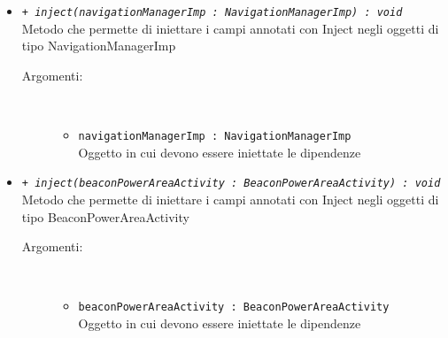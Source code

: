 \documentclass[../DefinizioneDiProdotto.tex]{subfiles}
\begin{document}
\begin{description}
\begin{itemize}
		\item \texttt{+ \textit{inject(navigationManagerImp : NavigationManagerImp) : void}}\\
		Metodo che permette di iniettare i campi annotati con Inject negli oggetti di tipo NavigationManagerImp
		\begin{description}
			\item[Argomenti:] \
			\begin{itemize}
				\item \texttt{navigationManagerImp : NavigationManagerImp}\\
				Oggetto in cui devono essere iniettate le dipendenze\end{itemize}
		\end{description}
		\item \texttt{+ \textit{inject(beaconPowerAreaActivity : BeaconPowerAreaActivity) : void}}\\
		Metodo che permette di iniettare i campi annotati con Inject negli oggetti di tipo BeaconPowerAreaActivity
		\begin{description}
			\item[Argomenti:] \
			\begin{itemize}
				\item \texttt{beaconPowerAreaActivity : BeaconPowerAreaActivity}\\
				Oggetto in cui devono essere iniettate le dipendenze\end{itemize}
		\end{description}
	\end{itemize}
\end{description}
\end{document}
